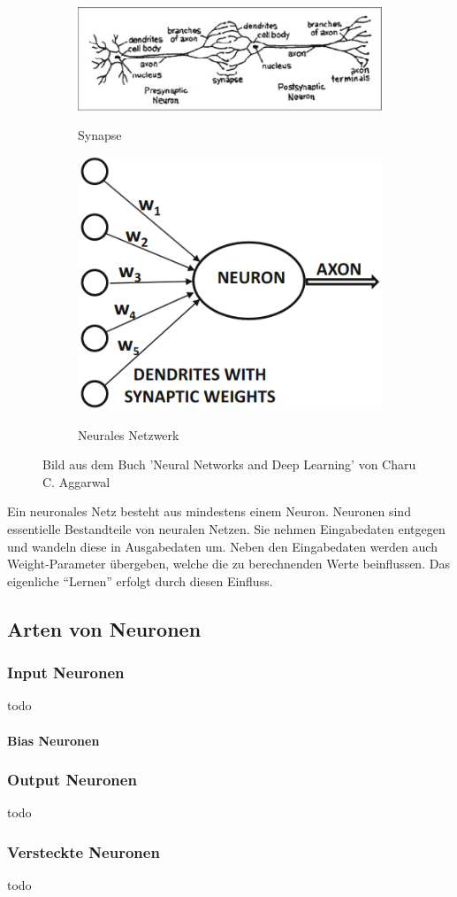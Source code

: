 \begin{figure}[H]
\begin{subfigure}{0.6\textwidth}
    \includegraphics[width=\textwidth]{Sources/01-01_synapse.png}
    \label{Synapse}
    \caption{Synapse}
\end{subfigure}
\begin{subfigure}{0.25\textwidth}
    \includegraphics[width=\textwidth]{Sources/01-02_neuron.png}
    \label{Neuron}
    \caption{Neurales Netzwerk}
\end{subfigure}
\caption{Bild aus dem Buch 'Neural Networks and Deep Learning' von Charu C. Aggarwal
}
\end{figure}
\noindent
Ein neuronales Netz besteht aus mindestens einem Neuron. Neuronen sind essentielle Bestandteile von neuralen Netzen. Sie nehmen Eingabedaten entgegen und wandeln diese 
in Ausgabedaten um. Neben den Eingabedaten werden auch Weight-Parameter übergeben, welche die zu berechnenden Werte beinflussen. Das eigenliche \enquote{Lernen} erfolgt durch diesen 
Einfluss.
\subsection{Arten von Neuronen}\label{subsec:neuronen:arten_von_neuronen}
\subsubsection{Input Neuronen}
todo
\paragraph{Bias Neuronen}
\subsubsection{Output Neuronen}
todo
\subsubsection{Versteckte Neuronen}
todo